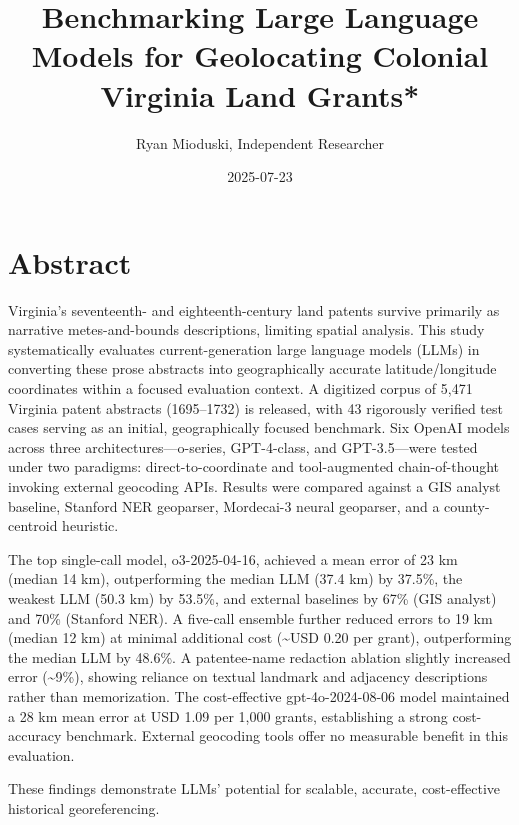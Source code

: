 \documentclass[
  10pt]{article}
\title{Benchmarking Large Language Models for Geolocating Colonial
Virginia Land Grants*}
\author{Ryan Mioduski, Independent Researcher}
\date{2025-07-23}
\begin{document}
\maketitle

\vspace{1em}

\section{Abstract}\label{abstract}

Virginia's seventeenth- and eighteenth-century land patents survive
primarily as narrative metes-and-bounds descriptions, limiting spatial
analysis. This study systematically evaluates current-generation large
language models (LLMs) in converting these prose abstracts into
geographically accurate latitude/longitude coordinates within a focused
evaluation context. A digitized corpus of 5,471 Virginia patent
abstracts (1695--1732) is released, with 43 rigorously verified test
cases serving as an initial, geographically focused benchmark. Six
OpenAI models across three architectures---o-series, GPT-4-class, and
GPT-3.5---were tested under two paradigms: direct-to-coordinate and
tool-augmented chain-of-thought invoking external geocoding APIs.
Results were compared against a GIS analyst baseline, Stanford NER
geoparser, Mordecai-3 neural geoparser, and a county-centroid heuristic.

The top single-call model, o3-2025-04-16, achieved a mean error of 23 km
(median 14 km), outperforming the median LLM (37.4 km) by 37.5\%, the
weakest LLM (50.3 km) by 53.5\%, and external baselines by 67\% (GIS
analyst) and 70\% (Stanford NER). A five-call ensemble further reduced
errors to 19 km (median 12 km) at minimal additional cost
(\textasciitilde USD 0.20 per grant), outperforming the median LLM by
48.6\%. A patentee-name redaction ablation slightly increased error
(\textasciitilde9\%), showing reliance on textual landmark and adjacency
descriptions rather than memorization. The cost-effective
gpt-4o-2024-08-06 model maintained a 28 km mean error at USD 1.09 per
1,000 grants, establishing a strong cost-accuracy benchmark. External
geocoding tools offer no measurable benefit in this evaluation.

These findings demonstrate LLMs' potential for scalable, accurate,
cost-effective historical georeferencing.

\renewcommand{\thefootnote}{\fnsymbol{footnote}}
\end{document}
